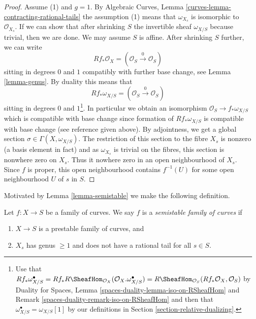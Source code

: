 \begin{proof}
\medskip\noindent
Assume (1) and $g = 1$. By
Algebraic Curves, Lemma \ref{curves-lemma-contracting-rational-tails}
the assumption (1) means that $\omega_{X_s}$ is isomorphic to
$\mathcal{O}_{X_s}$. If we can show that after shrinking $S$
the invertible sheaf $\omega_{X/S}$ because trivial, then
we are done. We may assume $S$ is affine. After shrinking $S$
further, we can write
$$
Rf_*\mathcal{O}_X = (\mathcal{O}_S \xrightarrow{0} \mathcal{O}_S)
$$
sitting in degrees $0$ and $1$
compatibly with further base change, see Lemma \ref{lemma-genus}.
By duality this means that
$$
Rf_*\omega_{X/S} = (\mathcal{O}_S \xrightarrow{0} \mathcal{O}_S)
$$
sitting in degrees $0$ and $1$\footnote{Use that
$Rf_*\omega_{X/S}^\bullet =
Rf_*R\SheafHom_{\mathcal{O}_X}(\mathcal{O}_X. \omega_{X/S}^\bullet) =
R\SheafHom_{\mathcal{O}_S}(Rf_*\mathcal{O}_X, \mathcal{O}_S)$
by Duality for Spaces, Lemma \ref{spaces-duality-lemma-iso-on-RSheafHom} and
Remark \ref{spaces-duality-remark-iso-on-RSheafHom}
and then that $\omega_{X/S}^\bullet = \omega_{X/S}[1]$ by
our definitions in Section \ref{section-relative-dualizing}.}.
In particular we obtain an isomorphism $\mathcal{O}_S \to f_*\omega_{X/S}$
which is compatible with base change since
formation of $Rf_*\omega_{X/S}$ is compatible with base change
(see reference given above).
By adjointness, we get a global section $\sigma \in \Gamma(X, \omega_{X/S})$.
The restriction of this section to the fibre $X_s$
is nonzero (a basis element in fact) and as
$\omega_{X_s}$ is trivial on the fibres,
this section is nonwhere zero on $X_s$.
Thus it nowhere zero in
an open neighbourhood of $X_s$. Since $f$ is proper, this open
neighbourhood contains $f^{-1}(U)$ for some open neighbourhood
$U$ of $s$ in $S$.
\end{proof}

\noindent
Motivated by Lemma \ref{lemma-semistable} we make the following definition.

\begin{definition}
\label{definition-semistable}
Let $f : X \to S$ be a family of curves.
We say $f$ is a {\it semistable family of curves} if
\begin{enumerate}
\item $X \to S$ is a prestable family of curves, and
\item $X_s$ has genus $\geq 1$ and
does not have a rational tail for all $s \in S$.
\end{enumerate}
\end{definition}

